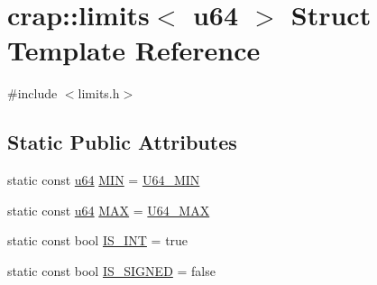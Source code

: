 \hypertarget{structcrap_1_1limits_3_01u64_01_4}{\section{crap\-:\-:limits$<$ u64 $>$ Struct Template Reference}
\label{structcrap_1_1limits_3_01u64_01_4}
}


{\ttfamily \#include $<$limits.\-h$>$}

\subsection*{Static Public Attributes}
\begin{DoxyCompactItemize}
\item 
static const \hyperlink{types_8h_a3f7e2bcbb0b4c338f3c4f6c937cd4234}{u64} \hyperlink{structcrap_1_1limits_3_01u64_01_4_a307736ccb34fa4e61dc2e993f1e029db}{M\-I\-N} = \hyperlink{types_8h_a361528a08635372583d48b4d6e35dfa5}{U64\-\_\-\-M\-I\-N}
\item 
static const \hyperlink{types_8h_a3f7e2bcbb0b4c338f3c4f6c937cd4234}{u64} \hyperlink{structcrap_1_1limits_3_01u64_01_4_a948bee8825f44d2d1ca308119a564f8d}{M\-A\-X} = \hyperlink{types_8h_aaf73a88ad00da5c878558d6dc80b2f5c}{U64\-\_\-\-M\-A\-X}
\item 
static const bool \hyperlink{structcrap_1_1limits_3_01u64_01_4_a3ea308607ff41e00fd16ddd0e9fbdb2d}{I\-S\-\_\-\-I\-N\-T} = true
\item 
static const bool \hyperlink{structcrap_1_1limits_3_01u64_01_4_ab32b1932605073ebb8b29cfa59ea1d6d}{I\-S\-\_\-\-S\-I\-G\-N\-E\-D} = false
\end{DoxyCompactItemize}



